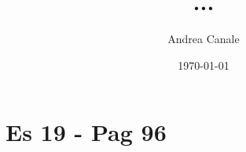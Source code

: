 \documentclass[11pt]{article}
\title{ ... }
\author{ Andrea Canale }
\date{\today}
\begin{document}
\maketitle	

\section{Es 19 - Pag 96}



\pagebreak
\end{document}
